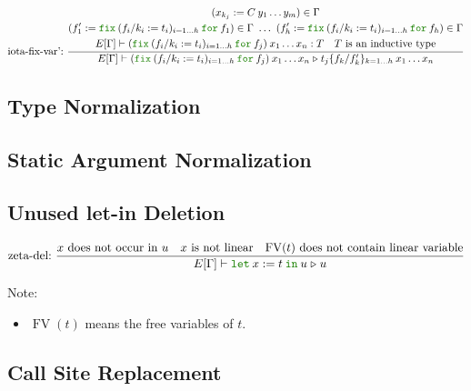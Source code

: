 \documentclass[a4paper,fleqn]{article}
\newcommand{\kwlet}{\mbox{\color{mygreen}\ttfamily let}}
\newcommand{\kwin}{\mbox{\color{mygreen}\ttfamily in}}
\newcommand{\kwfix}{\mbox{\color{mygreen}\ttfamily fix}}
\newcommand{\kwfor}{\mbox{\color{mygreen}\ttfamily for}}
\newcommand{\letin}[3]{\kwlet\:#1:=#2\:\kwin\:#3}
\newcommand{\fix}[4]{\kwfix\:(#1 := #2)_{#3}\:\kwfor\:#4}
\DeclareMathOperator{\FV}{FV}
\newcommand{\subst}[3]{#1\{#2/#3\}}
\newcommand{\reltri}{\mathrel{\triangleright}}
\begin{document}
\begin{gather*}
  \text{iota-fix-var':}~
    \dfrac
    {
      \begin{gathered}
        (x_{k_j} := C\:y_1\ldots y_m) \in \Gamma \\
        (f'_1 := \fix{f_i/k_i}{t_i}{i=1\ldots h}{f_1}) \in \Gamma ~\ldots~
        (f'_h := \fix{f_i/k_i}{t_i}{i=1\ldots h}{f_h}) \in \Gamma \\
        E[\Gamma] \vdash (\fix{f_i/k_i}{t_i}{i=1\ldots h}{f_j})\:x_1\ldots x_n : T \quad
        \text{$T$ is an inductive type}
      \end{gathered}
    }{
      E[\Gamma] \vdash
      (\fix{f_i/k_i}{t_i}{i=1\ldots h}{f_j})\:x_1\ldots x_n
      \reltri
      \subst{t_j}{f_k}{f'_k}_{k=1\ldots h} \:x_1 \ldots x_n
    }
\end{gather*}

\subsection{Type Normalization}\label{sec:type-normalization}
\subsection{Static Argument Normalization}\label{sec:static-argument-normalization}
\subsection{Unused let-in Deletion}\label{sec:let-in-deletion}
\begin{gather*}
  \text{zeta-del:}~
    \dfrac{
      \text{$x$ does not occur in $u$} \quad \text{$x$ is not linear} \quad \text{$\FV(t)$ does not contain linear variable}
    }{E[\Gamma] \vdash \letin{x}{t}{u}
                       \reltri
                       u
    }
\end{gather*}
{\small Note:
\begin{itemize}
  \item $\FV(t)$ means the free variables of $t$.
\end{itemize}}

\subsection{Call Site Replacement}\label{sec:call-site-replacement}
\end{document}
